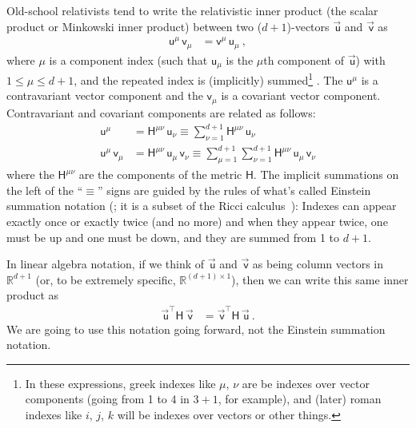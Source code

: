 \documentclass{article}
\newcommand{\metric}{\mathsf{H}}
\newcommand\upvec[1]{\!\vec{\,\mathrm{#1}}}
\newcommand{\Lvec}[1]{\upvec{\mathsf{#1}}} %
\newcommand{\Lblank}[1]{\mathsf{#1}} %
\newcommand{\plus}{\!+\!} %
\begin{document}
Old-school relativists tend to write the relativistic inner product (the scalar product or Minkowski inner product) between two ($d\plus1$)-vectors $\Lvec{u}$ and $\Lvec{v}$ as
\begin{align}
    \Lblank{u}^\mu\,\Lblank{v}_\mu &= \Lblank{v}^\mu\,\Lblank{u}_\mu ~,
\end{align}
where $\mu$ is a component index (such that $\Lblank{u}_\mu$ is the $\mu$th component of $\Lvec{u}$) with $1\leq\mu\leq d+1$, and the repeated index is (implicitly) summed\footnote{%
In these expressions, greek indexes like $\mu$, $\nu$ are be indexes over vector components (going from 1 to 4 in $3\plus1$, for example), and (later) roman indexes like $i$, $j$, $k$ will be indexes over vectors or other things.} .
The $\Lblank{u}^\mu$ is a contravariant vector component and the $\Lblank{v}_\mu$ is a covariant vector component.
Contravariant and covariant components are related as follows:
\begin{align}
    \Lblank{u}^\mu &= \metric^{\mu\nu}\,\Lblank{u}_\nu \equiv \sum_{\nu=1}^{d+1} \metric^{\mu\nu}\,\Lblank{u}_\nu
    \\
    \Lblank{u}^\mu\,\Lblank{v}_\mu &= \metric^{\mu\nu}\,\Lblank{u}_\mu\,\Lblank{v}_\nu \equiv \sum_{\mu=1}^{d+1}\sum_{\nu=1}^{d+1} \metric^{\mu\nu}\,\Lblank{u}_\mu\,\Lblank{v}_\nu
\end{align}
where the $\metric^{\mu\nu}$ are the components of the metric $\metric$.
The implicit summations on the left of the ``$\equiv$'' signs are guided by the rules of what's called Einstein summation notation (\cite{summation}; it is a subset of the Ricci calculus~\cite{ricci}): Indexes can appear exactly once or exactly twice (and no more) and when they appear twice, one must be up and one must be down, and they are summed from 1 to $d+1$.

In linear algebra notation, if we think of $\Lvec{u}$ and $\Lvec{v}$ as being column vectors in $\mathbb{R}^{d+1}$ (or, to be extremely specific, $\mathbb{R}^{(d+1)\times 1}$), then we can write this same inner product as
\begin{align}\label{eq:inner}
    \Lvec{u}^\top\metric\,\Lvec{v} &= \Lvec{v}^\top\metric\,\Lvec{u} ~.
\end{align}
We are going to use this notation going forward, not the Einstein summation notation.
\end{document}
